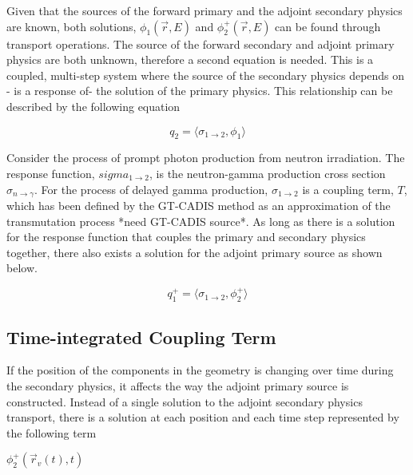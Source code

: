 Given that the sources of the forward primary and the adjoint secondary physics
are known, both solutions, $ \phi_{1}(\overrightarrow{r},E) $ and
$\phi_{2}^{+}(\overrightarrow{r},E) $ can be found through transport operations.
The source of the forward secondary and adjoint primary physics are both
unknown, therefore a second equation is needed.  This is a coupled, multi-step
system where the source of the secondary physics depends on - is a response of-
the solution of the primary physics.  This relationship can be described by the following equation

 \begin{equation}\label{eq:fwd_src}
	 q_{2} =
	 \langle \sigma_{1\rightarrow2}, \phi_{1} \rangle
 \end{equation}

Consider the process of prompt photon production from neutron irradiation.
The response function, $sigma_{1\rightarrow2}$, is the neutron-gamma production
cross section $\sigma_{n\rightarrow\gamma}$.  For the process of delayed gamma
production, $\sigma_{1\rightarrow2}$ is a
coupling term, $T$, which has been defined by the GT-CADIS method as an approximation of the transmutation
process *need GT-CADIS source*.  As long as there is a solution for the
response function that couples the primary and secondary physics together,
there also exists a solution for the adjoint primary source as shown below.

 \begin{equation}\label{eq:adj_src_1}
	 q_{1}^{+} = 
	 \langle \sigma_{1\rightarrow2}, \phi_{2}^{+} \rangle
 \end{equation}



\subsection{Time-integrated Coupling Term}
If the position of the components in the geometry is changing over time during
the secondary physics, it affects the way the adjoint primary source is
constructed.  Instead of a single solution to the 
adjoint secondary physics transport, there is a 
solution at each position and each time step represented by the following term

	$ \phi_{2}^{+}(\overrightarrow{r}_{v}(t), t)$

